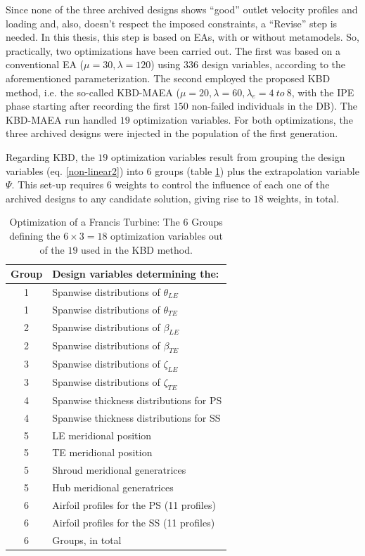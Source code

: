 Since none of the three archived designs shows ``good'' outlet velocity profiles and loading and, also, doesn't respect the imposed constraints, a ``Revise'' step is needed. In this thesis, this step is based on EAs, with or without metamodels. So, practically, two optimizations have been carried out. The first was based on a conventional EA ($\mu\!=\!30,\lambda\!=\!120$) using $336$ design variables, according to the aforementioned parameterization. The second employed the proposed KBD method, i.e. the so-called KBD-MAEA ($\mu\!=\!20,\lambda\!=\!60,\lambda_e\!=\! 4 ~ to ~ 8$, with the IPE phase starting after recording the first $150$ non-failed individuals in the DB). The KBD-MAEA run handled $19$ optimization variables. For both optimizations, the three archived designs were injected in the population of the first generation.

Regarding KBD, the $19$ optimization variables result from grouping the design variables (eq. \ref{non-linear2}) into $6$ groups (table \ref{design_groups}) plus the extrapolation variable $\Psi$. This set-up requires $6$ weights to control the influence of each one of the archived designs to any candidate solution, giving rise to $18$ weights, in total.

\begin{table}[h!]
\begin{center}
\begin{tabular}{ |c|l| }
\hline

Group              & Design variables determining the:\\
\hline
1 & Spanwise distributions of $\theta_{LE}$\\
\hline
1 & Spanwise distributions of $\theta_{TE}$\\
\hline
2 & Spanwise distributions of $\beta_{LE}$\\
\hline
2 & Spanwise distributions of $\beta_{TE}$\\
\hline
3 & Spanwise distributions of $\zeta_{LE}$\\
\hline
3 & Spanwise distributions of $\zeta_{TE}$\\
\hline
4 & Spanwise thickness distributions for PS \\
\hline
4 & Spanwise thickness distributions for SS\\
\hline
5 & LE meridional position\\
\hline
5 & TE meridional position\\
\hline
5 & Shroud meridional generatrices \\
\hline
5 & Hub meridional generatrices\\
\hline
6 & Airfoil profiles for the PS (11 profiles)\\
\hline
6 & Airfoil profiles  for the SS (11 profiles)\\
\hline
\hline
6 & Groups, in total \\
\hline   
\end{tabular}
\caption{
Optimization of a Francis Turbine: The $6$ Groups  defining the $6 \times 3=18$ optimization variables out of the $19$ used in the KBD method.}
\label{design_groups}
\end{center}
\end{table}

